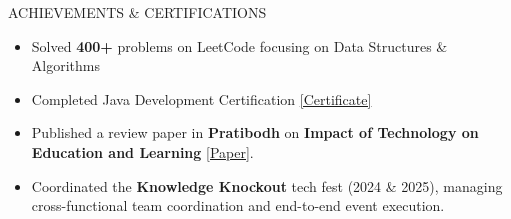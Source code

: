 \documentclass{resume}
\begin{document}
\begin{rSection}{ACHIEVEMENTS \& CERTIFICATIONS}
\vspace{-2pt}
\begin{itemize}[leftmargin=*, itemsep=-3pt, topsep=0pt]
\item Solved \textbf{400+} problems on LeetCode focusing on Data Structures \& Algorithms
\item Completed Java Development Certification
\href{https://drive.google.com/file/d/19W0G-xFzkwkhkULccCE2gLa9lP_WyJ1U/view?usp=drive_link}{[Certificate]}
\item Published a review paper in \textbf{Pratibodh} on \textbf{Impact of Technology on Education and Learning}
\href{https://pratibodh.org/index.php/pratibodh/article/view/345}{[Paper]}.
\item Coordinated the \textbf{Knowledge Knockout} tech fest (2024 \& 2025), managing
cross-functional team coordination and end-to-end event execution.
\end{itemize}
\end{rSection}
\end{document}
